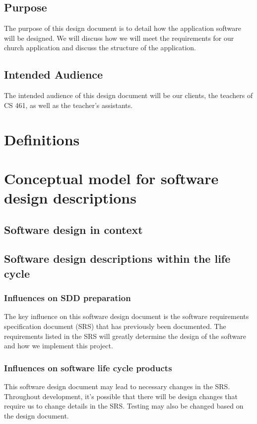 \documentclass[letterpaper,10pt,draftclsnofoot,onecolumn,titlepage]{IEEEtran}
\begin{document}
		\subsection{Purpose}
			The purpose of this design document is to detail how the application software will be designed. 
			We will discuss how we will meet the requirements for our church application and discuss the structure of the application. 
		\subsection{Intended Audience}
			The intended audience of this design document will be our clients, the teachers of CS 461, as well as the teacher's assistants. 
	
		
	\section{Definitions}
	
	\section{Conceptual model for software design descriptions}
	
		\subsection{Software design in context}
		
		\subsection{Software design descriptions within the life cycle}
		
			\subsubsection{Influences on SDD preparation}
				The key influence on this software design document is the software requirements specification document (SRS) that has previously been documented. 
				The requirements listed in the SRS will greatly determine the design of the software and how we implement this project. 
			
			\subsubsection{Influences on software life cycle products}
				This software design document may lead to necessary changes in the SRS. 
				Throughout development, it's possible that there will be design changes that require us to change details in the SRS. 
				Testing may also be changed based on the design document. 
				
\end{document}
